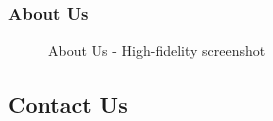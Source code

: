 \documentclass[11pt, letterpaper]{article}
\begin{document}
\subsubsection*{About Us}
\begin{figure}[H]
    \centering
    \setlength{\fboxsep}{0pt}
    \caption{About Us - High-fidelity screenshot}
    \label{fig:PageScreenshot_About_Us}
\end{figure}

\subsection{Contact Us}
\end{document}
